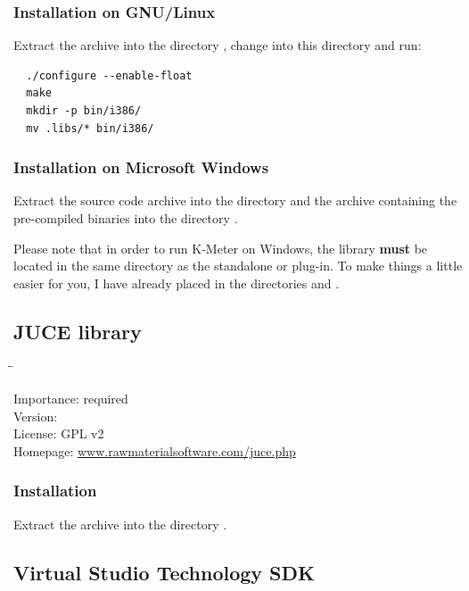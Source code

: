 \subsubsection{Installation on GNU/Linux}

Extract the archive into the directory , change
into this directory and run:

\begin{verbatim}
  ./configure --enable-float
  make
  mkdir -p bin/i386/
  mv .libs/* bin/i386/
\end{verbatim}

\subsubsection{Installation on Microsoft Windows}

Extract the source code archive into the directory
 and the archive containing the pre-compiled
binaries into the directory .

Please note that in order to run K-Meter on Windows, the library
 \textbf{must} be located in the same directory
as the standalone or plug-in.  To make things a little easier for you,
I have already placed  in the directories
 and .

\subsection{JUCE library}

\begin{tabbing}
  \hspace*{6em}\=\=\kill

  Importance:  \> required \\
  Version:      \\
  License:     \> GPL v2 \\
  Homepage:    \> \href{http://www.rawmaterialsoftware.com/juce.php}{www.rawmaterialsoftware.com/juce.php}
\end{tabbing}

\subsubsection{Installation}

Extract the archive into the directory .

\subsection{Virtual Studio Technology SDK}

